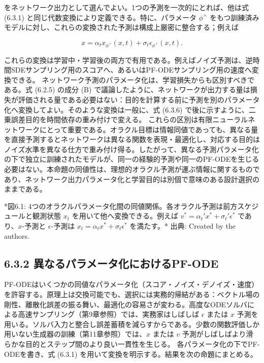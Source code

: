 をネットワーク出力として選んでよい。1つの予測を一次的にとれば、他は式 (6.3.1) と同じ代数変換により定義できる。特に、パラメータ $\phi^\times$ をもつ訓練済みモデルに対し、これらの変換された予測は構成上厳密に整合する；例えば

\[
x=\alpha_t x_{\phi^\times}(x,t)+\sigma_t\epsilon_{\phi^\times}(x,t).
\]


これらの変換は学習中・学習後の両方で有用である。例えばノイズ予測は、逆時間SDEサンプリング用のスコアへ、あるいはPF-ODEサンプリング用の速度へ変換できる。
ネットワーク予測のパラメータ化は、学習損失からも区別すべきである。式 (6.2.5) の成分 (B) で議論したように、ネットワークが出力する量は損失が評価される量である必要はない：目的を計算する前に予測を別のパラメータ化へ変換してよい。そのような変換は一般に、式 (6.3.6) で後に示すように、二乗誤差目的を時間依存の重み付けで変える。
これらの区別は有限ニューラルネットワークにとって重要である。オラクル目標は情報同値であっても、異なる量を直接予測するとネットワークは異なる関数を表現・最適化し、対応する目的はノイズ水準を異なる仕方で重み付け得る。したがって、異なる予測パラメータ化の下で独立に訓練されたモデルが、同一の経験的予測や同一のPF-ODEを生じる必要はない。本命題の同値性は、理想的オラクル予測が運ぶ情報に関するものであり、ネットワーク出力パラメータ化と学習目的は別個で意味のある設計選択のままである。



*図6.1: 4つのオラクルパラメータ化間の同値関係。各オラクル予測は前方スケジュールと観測状態 $x_t$ を用いて他へ変換できる。例えば $v^*=\alpha_t'x^*+\sigma_t'\epsilon^*$ であり、$x$-予測と $\epsilon$-予測は $x_t=\alpha_t x^*+\sigma_t\epsilon^*$ を満たす。*
出典: Created by the authors.

\subsection*{6.3.2 異なるパラメータ化におけるPF-ODE}


PF-ODEはいくつかの同値なパラメータ化（スコア・ノイズ・デノイズ・速度）を許容する。原理上は交換可能でも、選択には実務的帰結がある：ベクトル場の剛性、離散化誤差の振る舞い、最適化の容易さが変わる。高度なODEソルバによる高速サンプリング（第9章参照）では、実務家はしばしば $\epsilon$ または $x$ 予測を用いる。ソルバ入力と整合し誤差蓄積を減らすからである。少数の関数評価しか用いない生成器の訓練（第11章参照）では、$x$ または $v$ 予測がしばしばより滑らかな目的とステップ間のより良い一貫性を生じる。
各パラメータ化の下でPF-ODEを書き、式 (6.3.1) を用いて変換を明示する。結果を次の命題にまとめる。

